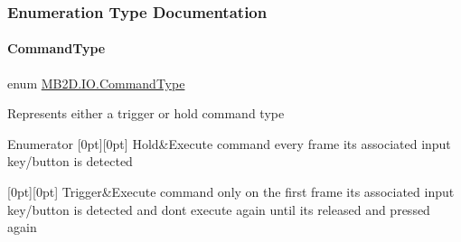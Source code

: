 \subsubsection{Enumeration Type Documentation}
\hypertarget{namespace_m_b2_d_1_1_i_o_ab5f95f3fe9e652778b62bdf943168a68}{}\label{namespace_m_b2_d_1_1_i_o_ab5f95f3fe9e652778b62bdf943168a68} 
\paragraph{\texorpdfstring{Command\+Type}{CommandType}}
{\footnotesize\ttfamily enum \hyperlink{namespace_m_b2_d_1_1_i_o_ab5f95f3fe9e652778b62bdf943168a68}{M\+B2\+D.\+I\+O.\+Command\+Type}\hspace{0.3cm}{\ttfamily [strong]}}



Represents either a trigger or hold command type 

\begin{DoxyEnumFields}{Enumerator}
[0pt][0pt]{}\hypertarget{namespace_m_b2_d_1_1_i_o_ab5f95f3fe9e652778b62bdf943168a68abcd8db575b47c838e5d551e3973db4ac}{}\label{namespace_m_b2_d_1_1_i_o_ab5f95f3fe9e652778b62bdf943168a68abcd8db575b47c838e5d551e3973db4ac} 
Hold&Execute command every frame its associated input key/button is detected \\
\hline

[0pt][0pt]{}\hypertarget{namespace_m_b2_d_1_1_i_o_ab5f95f3fe9e652778b62bdf943168a68af698f67f5666aff10729d8a1cb1c14d2}{}\label{namespace_m_b2_d_1_1_i_o_ab5f95f3fe9e652778b62bdf943168a68af698f67f5666aff10729d8a1cb1c14d2} 
Trigger&Execute command only on the first frame its associated input key/button is detected and don\textquotesingle{}t execute again until it\textquotesingle{}s released and pressed again \\
\hline

\end{DoxyEnumFields}
